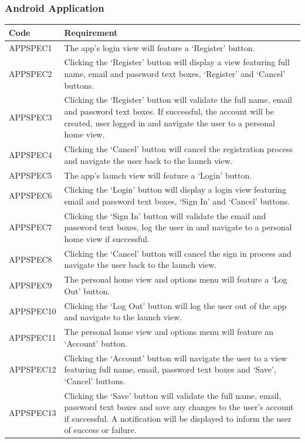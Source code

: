 \documentclass[11pt,a4paper]{article}
\begin{document}
\subsubsection{Android Application}

\begin{longtable}{|p{2.5cm}p{13cm}|}
\hline
\textbf{Code} & \textbf{Requirement} \\

\hline
APPSPEC1 & The app's login view will feature a `Register' button. \\ \hline
APPSPEC2 & Clicking the `Register' button will display a view featuring full name, email and password text boxes, `Register' and `Cancel' buttons. \\ \hline
APPSPEC3 & Clicking the `Register' button will validate the full name, email and password text boxes. If successful, the account will be created, user logged in and navigate the user to a personal home view. \\ \hline
APPSPEC4 & Clicking the `Cancel' button will cancel the registration process and navigate the user back to the launch view. \\ \hline
APPSPEC5 & The app's launch view will feature a `Login' button. \\ \hline
APPSPEC6 & Clicking the `Login' button will display a login view featuring email and password text boxes, `Sign In' and `Cancel' buttons. \\ \hline
APPSPEC7 & Clicking the `Sign In' button will validate the email and password text boxes, log the user in and navigate to a personal home view if successful. \\ \hline
APPSPEC8 & Clicking the `Cancel' button will cancel the sign in process and navigate the user back to the launch view. \\ \hline
APPSPEC9 & The personal home view and options menu will feature a `Log Out' button. \\ \hline
APPSPEC10 & Clicking the `Log Out' button will log the user out of the app and navigate to the launch view. \\ \hline
APPSPEC11 & The personal home view and options menu will feature an `Account' button. \\ \hline
APPSPEC12 & Clicking the `Account' button will navigate the user to a view featuring full name, email, password text boxes and `Save', `Cancel' buttons. \\ \hline
APPSPEC13 & Clicking the `Save' button will validate the full name, email, password text boxes and save any changes to the user's account if successful. A notification will be displayed to inform the user of success or failure. \\ \hline

\end{longtable}
\end{document}
